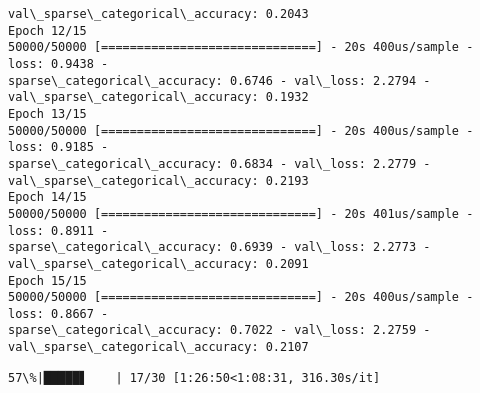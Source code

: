 \documentclass[11pt]{article}
\begin{document}
\begin{Verbatim}[commandchars=\\\{\}]
val\_sparse\_categorical\_accuracy: 0.2043
Epoch 12/15
50000/50000 [==============================] - 20s 400us/sample - loss: 0.9438 -
sparse\_categorical\_accuracy: 0.6746 - val\_loss: 2.2794 -
val\_sparse\_categorical\_accuracy: 0.1932
Epoch 13/15
50000/50000 [==============================] - 20s 400us/sample - loss: 0.9185 -
sparse\_categorical\_accuracy: 0.6834 - val\_loss: 2.2779 -
val\_sparse\_categorical\_accuracy: 0.2193
Epoch 14/15
50000/50000 [==============================] - 20s 401us/sample - loss: 0.8911 -
sparse\_categorical\_accuracy: 0.6939 - val\_loss: 2.2773 -
val\_sparse\_categorical\_accuracy: 0.2091
Epoch 15/15
50000/50000 [==============================] - 20s 400us/sample - loss: 0.8667 -
sparse\_categorical\_accuracy: 0.7022 - val\_loss: 2.2759 -
val\_sparse\_categorical\_accuracy: 0.2107
    \end{Verbatim}

    \begin{Verbatim}[commandchars=\\\{\}]
 57\%|█████▋    | 17/30 [1:26:50<1:08:31, 316.30s/it]
    \end{Verbatim}
\end{document}
